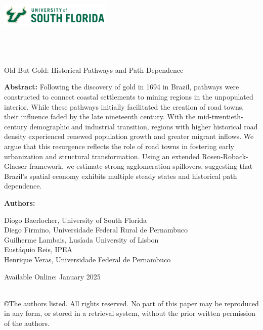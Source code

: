 \documentclass[11pt]{article}
\begin{document}
\onehalfspacing

\noindent \includegraphics[width = 0.4\textwidth]{USouthFlorida-lightbg-2c-rgb-h.png} \\

\noindent{\color{usfgreen} \rule{0.5\textwidth}{10pt}}{\color{usfgold} \rule{0.5\textwidth}{10pt}}\\

 \\
 \\

\vspace*{0.5in}

\begin{center} 
    \huge Old But Gold: Historical Pathways and Path Dependence
\end{center}

\vspace*{0.5in}

\noindent \textbf{Abstract:} Following the discovery of gold in 1694 in Brazil, pathways were constructed to connect coastal settlements to mining regions in the unpopulated interior. While these pathways initially facilitated the creation of road towns, their influence faded by the late nineteenth century. With the mid-twentieth-century demographic and industrial transition, regions with higher historical road density experienced renewed population growth and greater migrant inflows. We argue that this resurgence reflects the role of road towns in fostering early urbanization and structural transformation. Using an extended Rosen-Roback-Glaeser framework, we estimate strong agglomeration spillovers, suggesting that Brazil’s spatial economy exhibits multiple steady states and historical path dependence.
\vspace*{0.25in}

\noindent \textbf{Authors:}

Diogo Baerlocher, University of South Florida \\
\indent Diego Firmino, Universidade Federal Rural de Pernambuco \\
\indent Guilherme Lambais, Lusíada University of Lisbon \\
\indent Eust\'aquio Reis, IPEA \\
\indent Henrique Veras, Universidade Federal de Pernambuco \\


\vspace*{0.25in}


\noindent Available Online: January 2025 %

\vfill 
\noindent{\color{usfgreen} \rule{\textwidth}{5pt}}\\
\noindent \small ©The authors listed. All rights reserved. No part of this paper may be reproduced in any form, or stored in a retrieval system, without the prior written permission of the authors.
\thispagestyle{empty}
\end{document}
